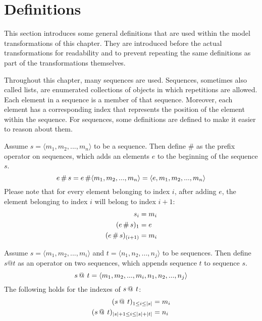 \section{Definitions}
\label{sec:library_of_transformations:definitions}

This section introduces some general definitions that are used within the model transformations of this chapter. They are introduced before the actual transformations for readability and to prevent repeating the same definitions as part of the transformations themselves.

Throughout this chapter, many sequences are used. Sequences, sometimes also called lists, are enumerated collections of objects in which repetitions are allowed. Each element in a sequence is a member of that sequence. Moreover, each element has a corresponding index that represents the position of the element within the sequence. For sequences, some definitions are defined to make it easier to reason about them.

\begin{defin}
\label{defin:library_of_transformations:definitions:prefix_sequences}
Assume $s = \langle m_1, m_2, ..., m_n \rangle$ to be a sequence. Then define $\#$ as the prefix operator on sequences, which adds an elements $e$ to the beginning of the sequence $s$.
\begin{equation*}
    e \operatorname{\#} s = e \operatorname{\#} \langle m_1, m_2, ..., m_n \rangle = \langle e, m_1, m_2, ..., m_n \rangle
\end{equation*}
Please note that for every element belonging to index $i$, after adding $e$, the element belonging to index $i$ will belong to index $i + 1$:
\begin{align*}
    s_i &= m_i \\
    (e \operatorname{\#} s)_1 &= e \\
    (e \operatorname{\#} s)_{(i+1)} &= m_i \\
\end{align*}
\end{defin}

\begin{defin}
\label{defin:library_of_transformations:definitions:append_sequences}
Assume $s = \langle m_1, m_2, ..., m_i \rangle$ and $t = \langle n_1, n_2, ..., n_j \rangle$ to be sequences. Then define $s @ t$ as an operator on two sequences, which appends sequence $t$ to sequence $s$.
\begin{equation*}
    s \operatorname{@\:} t = \langle m_1, m_2, ..., m_i, n_1, n_2, ..., n_j \rangle 
\end{equation*}
The following holds for the indexes of $s \operatorname{@\:} t$:
\begin{align*}
    (s \operatorname{@\:} t)_{1 \leq i \leq |s|} &= m_i \\
    (s \operatorname{@\:} t)_{|s| + 1 \leq i \leq |s| + |t|} &= n_i \\
\end{align*}
\end{defin}

